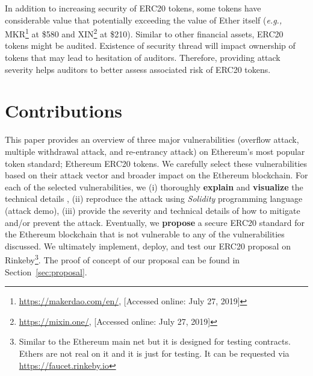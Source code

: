 In addition to increasing security of ERC20 tokens, some tokens have considerable value that potentially exceeding the value of Ether itself (\textit{e.g.,} MKR\footnote{\url{https://makerdao.com/en/}, [Accessed online: July 27, 2019]} at \$580 and XIN\footnote{\url{https://mixin.one/}, [Accessed online: July 27, 2019]} at \$210). Similar to other financial assets, ERC20 tokens might be audited. Existence of security thread will impact ownership of tokens that may lead to hesitation of auditors. Therefore, providing attack severity helps auditors to better assess associated risk of ERC20 tokens.

\section{Contributions}
This paper provides an overview of three major vulnerabilities (overflow attack, multiple withdrawal attack, and re-entrancy attack) on Ethereum's most popular token standard; Ethereum ERC20 tokens. We carefully select these vulnerabilities based on their attack vector and broader impact on the Ethereum blockchain. For each of the selected vulnerabilities, we (i) thoroughly \textbf{explain} and \textbf{visualize} the technical details , (ii) reproduce the attack using \textit{Solidity} programming language (attack demo), (iii) provide the severity and technical details of how to mitigate and/or prevent the attack. Eventually, we \textbf{propose} a secure ERC20 standard for the Ethereum blockchain that is not vulnerable to any of the vulnerabilities discussed. We ultimately implement, deploy, and test our ERC20 proposal on Rinkeby\footnote{Similar to the Ethereum main net but it is designed for testing contracts. Ethers are not real on it and it is just for testing. It can be requested via \url{https://faucet.rinkeby.io}}. The proof of concept of our proposal can be found in Section~\ref{sec:proposal}.


